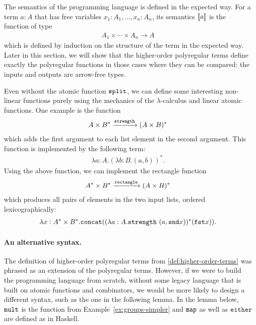 The semantics of the programming language is defined in the expected way. For a term $a : A$ that has free variables  $x_1 : A_1, \ldots, x_n : A_n$,  its semantics $[\![a]\!]$ is the  function  of type 
\begin{align*}
 {A_1} \times \cdots \times  {A_n} \to A
\end{align*}
which is defined by induction on the structure of the term in the expected way.  Later in this section, we will show that the higher-order polyregular terms define exactly the polyregular functions in those cases where they can be compared: the inputs and outputs are arrow-free types.


\begin{myexample}
    \label{ex:strength-and-rectangle}
    Even without the atomic function $\mathtt{split}$, we can define some interesting non-linear functions purely using the mechanics of the $\lambda$-calculus and linear atomic functions. One example is the function
    \begin{align*}
    A \times B^* \xrightarrow{ \mathtt{strength}} (A \times B)^* 
    \end{align*}
    which adds the first argument to each list element in the second argument. This function is implemented by the following term:
    \begin{align*}
    \lambda a : A. (\lambda b : B. (a,b))^*.
    \end{align*}
    Using the above function, we can implement the rectangle function
    \begin{align*}
    A^* \times B^* \xrightarrow{\mathtt{rectangle}} (A \times B)^* 
    \end{align*}
    which produces all pairs of elements in the two input lists, ordered lexicographically: 
        \begin{align*}
   \lambda x : A^* \times B^*. \mathtt{concat} (( \lambda a : A. \mathtt{strength}\ (a, \mathtt{snd} x))^*  (\mathtt{fst} x)).
    \end{align*}
\end{myexample}




\paragraph*{An alternative syntax.} The definition of higher-order polyregular terms from \cref{def:higher-order-terms} was phrased as an extension of the polyregular terms. However, if we were to build the programming language from scratch, without some legacy language that is built on atomic functions and combinators, we would be more likely to design a different syntax, such as the one in the following lemma.  In the lemma below, $\mathtt{mult}$ is the function from Example~\ref{ex:groups-simpler} and $\mathtt{map}$ as well as $\mathtt{either}$ are defined as in Haskell.


